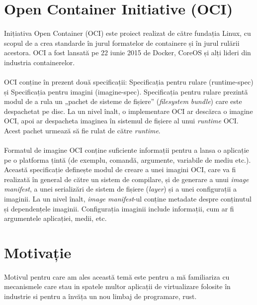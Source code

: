 \section{Open Container Initiative (OCI)}
    \paragraph{} Inițiativa Open Container (OCI) este proiect realizat de către fundația Linux, cu scopul de a crea standarde în jurul formatelor de containere și în jurul rulării acestora. OCI a fost lansată pe 22 iunie 2015 de Docker, CoreOS și alți lideri din industria containerelor.
    \paragraph{} OCI conține în prezent două specificații: Specificația pentru rulare (runtime-spec) și Specificația pentru imagini (imagine-spec). Specificația pentru rulare prezintă modul de a rula un „pachet de sisteme de fișiere” (\textit{filesystem bundle}) care este despachetat pe disc. La un nivel înalt, o implementare OCI ar descărca o imagine OCI, apoi ar despacheta imaginea în sistemul de fișiere al unui \textit{runtime} OCI. Acest pachet urmează să fie rulat de către \textit{runtime}.
    \paragraph{} Formatul de imagine OCI conține suficiente informații pentru a lansa o aplicație pe o platforma țintă (de exemplu, comandă, argumente, variabile de mediu etc.). Această specificație definește modul de creare a unei imagini OCI, care va fi realizată în general de către un sistem de compilare, și de generare a unui \textit{image manifest}, a unei serializări de sistem de fișiere (\textit{layer}) și a unei configurații a imaginii. La un nivel înalt, \textit{image manifest}-ul conține metadate despre conținutul și dependențele imaginii. Configurația imaginii include informații, cum ar fi argumentele aplicației, medii, etc.

\section{Motivație}
    \paragraph{} Motivul pentru care am ales această temă este pentru a mă familiariza cu mecanismele care stau in spatele multor aplicații de virtualizare folosite în industrie si pentru a învăța un nou limbaj de programare, rust.
